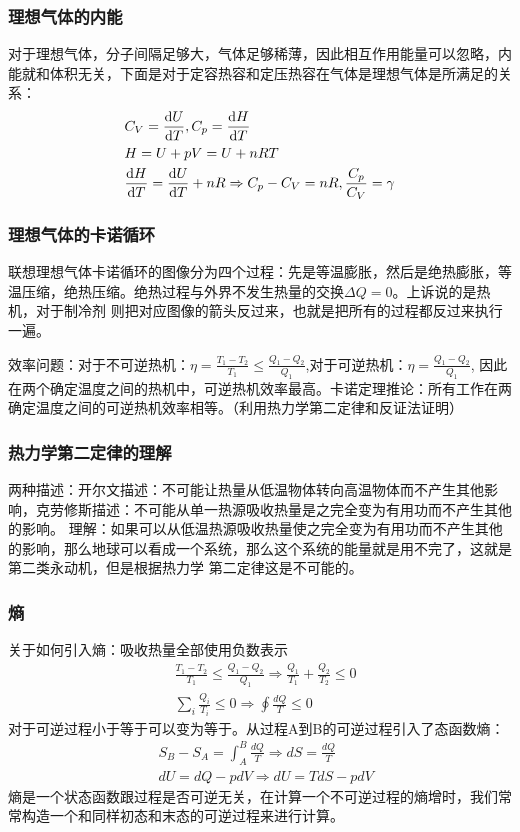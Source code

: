\documentclass[UTF8]{ctexart}
\begin{document}
\subsubsection{理想气体的内能}
对于理想气体，分子间隔足够大，气体足够稀薄，因此相互作用能量可以忽略，内能就和体积无关，下面是对于定容热容和定压热容在气体是理想气体是所满足的关系：
\begin{align*}
         & C_V=\dv{U}{T},C_p=\dv{H}{T}                                          \\
         & H=U+pV=U+nRT                                                         \\
         & \dv{H}{T}=\dv{U}{T}+nR \Rightarrow C_p-C_V=nR,\frac{C_p}{C_V}=\gamma
\end{align*}
\subsubsection{理想气体的卡诺循环}
联想理想气体卡诺循环的图像分为四个过程：先是等温膨胀，然后是绝热膨胀，等温压缩，绝热压缩。绝热过程与外界不发生热量的交换$\Delta Q=0$。上诉说的是热机，对于制冷剂
则把对应图像的箭头反过来，也就是把所有的过程都反过来执行一遍。

效率问题：对于不可逆热机：$\eta=\frac{T_1-T_2}{T_1}\leq \frac{Q_1-Q_2}{Q_1}$,对于可逆热机：$\eta=\frac{Q_1-Q_2}{Q_1}$,
因此在两个确定温度之间的热机中，可逆热机效率最高。卡诺定理推论：所有工作在两确定温度之间的可逆热机效率相等。（利用热力学第二定律和反证法证明）
\subsubsection{热力学第二定律的理解}
两种描述：开尔文描述：不可能让热量从低温物体转向高温物体而不产生其他影响，克劳修斯描述：不可能从单一热源吸收热量是之完全变为有用功而不产生其他的影响。
理解：如果可以从低温热源吸收热量使之完全变为有用功而不产生其他的影响，那么地球可以看成一个系统，那么这个系统的能量就是用不完了，这就是第二类永动机，但是根据热力学
第二定律这是不可能的。
\subsubsection{熵}
关于如何引入熵：吸收热量全部使用负数表示
\begin{align*}
         & \frac{T_1-T_2}{T_1}\leq \frac{Q_1-Q_2}{Q_1}\Rightarrow \frac{Q_1}{T_1}+\frac{Q_2}{T_2}\leq 0 \\
         & \sum_{i} \frac{Q_i}{T_i}\leq 0\Rightarrow \oint \frac{dQ}{T}\leq 0
\end{align*}
对于可逆过程小于等于可以变为等于。从过程A到B的可逆过程引入了态函数熵：
\begin{align*}
         & S_B-S_A=\int_A^B\frac{dQ}{T}\Rightarrow dS=\frac{dQ}{T} \\
         & dU=dQ-pdV\Rightarrow dU=TdS-pdV
\end{align*}
熵是一个状态函数跟过程是否可逆无关，在计算一个不可逆过程的熵增时，我们常常构造一个和同样初态和末态的可逆过程来进行计算。
\end{document}
